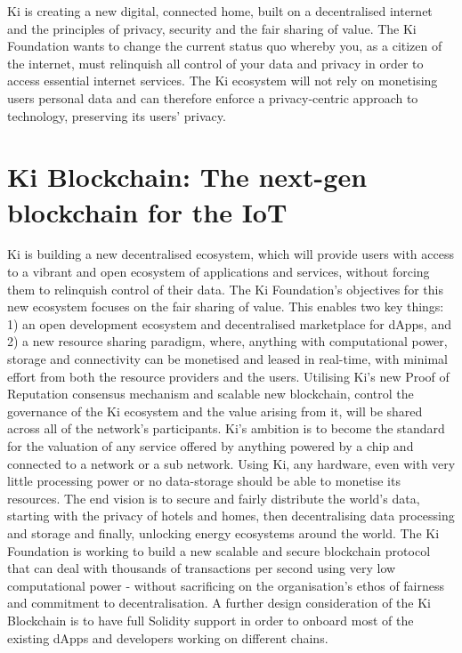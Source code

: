 Ki is creating a new digital, connected home, built on a decentralised internet and the principles of privacy, security and the fair sharing of value. The Ki Foundation wants to change the current status quo whereby you, as a citizen of the internet, must relinquish all control of your data and privacy in order to access essential internet services. The Ki ecosystem will not rely on monetising users personal data and can therefore enforce a privacy-centric approach to technology, preserving its users’ privacy.

\section{Ki Blockchain: The next-gen blockchain for the IoT}
\label{ch1}
Ki is building a new decentralised ecosystem, which will provide users with access to a vibrant and open ecosystem of applications and services, without forcing them to relinquish control of their data. The Ki Foundation’s objectives for this new ecosystem focuses on the fair sharing of value. This enables two key things: 1) an open development ecosystem and decentralised marketplace for dApps, and 2) a new resource sharing paradigm, where, anything with computational power, storage and connectivity can be monetised and leased in real-time, with minimal effort from both the resource providers and the users. Utilising Ki's new Proof of Reputation consensus mechanism and scalable new blockchain, control the governance of the Ki ecosystem and the value arising from it, will be shared across all of the network’s participants.
Ki’s ambition is to become the standard for the valuation of any service offered by anything powered by a chip and connected to a network or a sub network. Using Ki, any hardware, even with very little processing power or no data-storage should be able to monetise its resources. The end vision is to secure and fairly distribute the world's data, starting with the privacy of hotels and homes, then decentralising data processing and storage and finally, unlocking energy ecosystems around the world.
The Ki Foundation is working to build a new scalable and secure blockchain protocol that can deal with thousands of transactions per second using very low computational power - without sacrificing on the organisation’s ethos of fairness and commitment to decentralisation. A further design consideration of the Ki Blockchain is to have full Solidity support in order to onboard most of the existing dApps and developers working on different chains.
